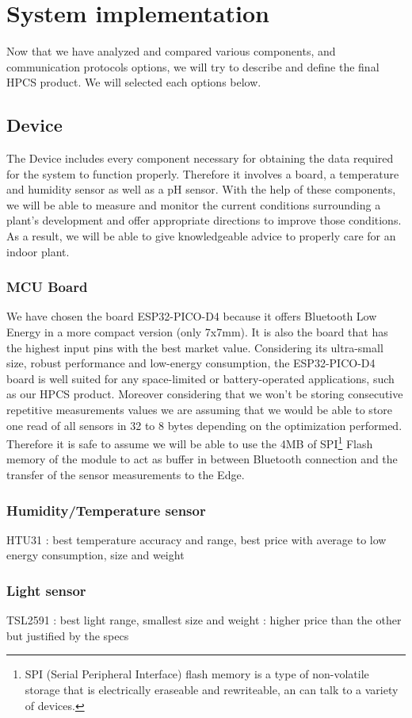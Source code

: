 \section{System implementation}
Now that we have analyzed and compared various components, and communication protocols options, we will try to describe and define the final HPCS product. We will selected each options below.
\subsection{Device}
The Device includes every component necessary for obtaining the data required for the system to function properly.
Therefore it involves a board, a temperature and humidity sensor as well as a pH sensor. With the help of these components, we will be able to measure and monitor the current conditions surrounding a plant's development and offer appropriate directions to improve those conditions. As a result, we will be able to give knowledgeable advice to properly care for an indoor plant.
\subsubsection{MCU Board}
We have chosen the board ESP32-PICO-D4 because it offers Bluetooth Low Energy in a more compact version (only 7x7mm). It is also the board that has the highest input pins with the best market value.
Considering its ultra-small size, robust performance and low-energy consumption, the ESP32-PICO-D4 board is well suited for any space-limited or battery-operated applications, such as our HPCS product.
Moreover considering that we won't be storing consecutive repetitive measurements values we are assuming that we would be able to store one read of all sensors in 32 to 8 bytes depending on the optimization performed. Therefore it is safe to assume we will be able to use the 4MB of SPI\footnote{SPI (Serial Peripheral Interface) flash memory is a type of non-volatile storage that is electrically eraseable and rewriteable, an can talk to a variety of devices.} Flash memory of the module to act as buffer in between Bluetooth connection and the transfer of the sensor measurements to the Edge.

\subsubsection{Humidity/Temperature sensor}
HTU31 : best temperature accuracy and range, best price with average to low energy consumption, size and weight 
\subsubsection{Light sensor}
TSL2591 : best light range, smallest size and weight : higher price than the other but justified by the specs
